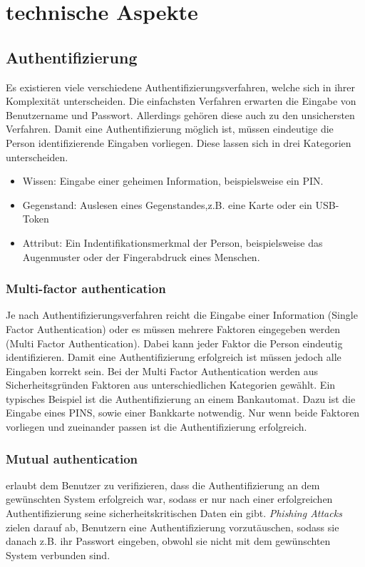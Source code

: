 
\section{technische Aspekte}
\subsection*{Authentifizierung}
Es existieren viele verschiedene Authentifizierungsverfahren, welche sich in ihrer Komplexität unterscheiden. Die einfachsten Verfahren erwarten die Eingabe von Benutzername und Passwort. Allerdings gehören diese auch zu den unsichersten Verfahren. Damit eine Authentifizierung möglich ist, müssen eindeutige die Person identifizierende Eingaben vorliegen. Diese lassen sich in drei Kategorien unterscheiden.
\begin{itemize}
\item Wissen: Eingabe einer geheimen Information, beispielsweise ein PIN.
\item Gegenstand: Auslesen eines Gegenstandes,z.B. eine Karte oder ein USB-Token
\item Attribut: Ein Indentifikationsmerkmal der Person, beispielsweise das Augenmuster oder der Fingerabdruck eines Menschen.
\end{itemize}
\subsubsection{Multi-factor authentication}
Je nach Authentifizierungsverfahren reicht die Eingabe einer Information (Single Factor Authentication) oder es müssen mehrere Faktoren eingegeben werden (Multi Factor Authentication).
Dabei kann jeder Faktor die Person eindeutig identifizieren. Damit eine Authentifizierung erfolgreich ist müssen jedoch alle Eingaben korrekt sein. Bei der Multi Factor Authentication werden aus Sicherheitsgründen Faktoren aus unterschiedlichen Kategorien gewählt. Ein typisches Beispiel ist die Authentifizierung an einem Bankautomat. Dazu ist die Eingabe eines PINS, sowie einer Bankkarte notwendig. Nur wenn beide Faktoren vorliegen und zueinander passen ist die Authentifizierung erfolgreich. 
\subsubsection{Mutual authentication}
erlaubt dem Benutzer zu verifizieren, dass die Authentifizierung an dem gewünschten System erfolgreich war, sodass er nur nach einer erfolgreichen Authentifizierung seine sicherheitskritischen Daten ein gibt. \textit{Phishing Attacks} zielen darauf ab, Benutzern eine Authentifizierung  vorzutäuschen, sodass sie danach z.B. ihr Passwort eingeben, obwohl sie nicht mit dem gewünschten System verbunden sind.


